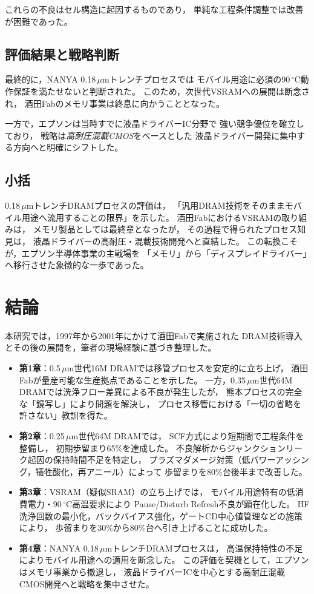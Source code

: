 \documentclass[conference]{IEEEtran}
\begin{document}
これらの不良はセル構造に起因するものであり，
単純な工程条件調整では改善が困難であった。

\subsection{評価結果と戦略判断}
最終的に，NANYA 0.18\,$\mu$mトレンチプロセスでは
モバイル用途に必須の90\,$^\circ$C動作保証を満たせないと判断された。
このため，次世代VSRAMへの展開は断念され，
酒田Fabのメモリ事業は終息に向かうこととなった。

一方で，エプソンは当時すでに液晶ドライバーIC分野で
強い競争優位を確立しており，
戦略は\emph{高耐圧混載CMOS}をベースとした
液晶ドライバー開発に集中する方向へと明確にシフトした。

\subsection{小括}
0.18\,$\mu$mトレンチDRAMプロセスの評価は，
「汎用DRAM技術をそのままモバイル用途へ流用することの限界」を示した。
酒田FabにおけるVSRAMの取り組みは，
メモリ製品としては最終章となったが，
その過程で得られたプロセス知見は，
液晶ドライバーの高耐圧・混載技術開発へと直結した。
この転換こそが，エプソン半導体事業の主戦場を
「メモリ」から「ディスプレイドライバー」へ移行させた象徴的な一歩であった。

\section{結論}

本研究では，1997年から2001年にかけて酒田Fabで実施された
DRAM技術導入とその後の展開を，筆者の現場経験に基づき整理した。

\begin{itemize}
  \item \textbf{第1章}：0.5\,$\mu$m世代16M DRAMでは移管プロセスを安定的に立ち上げ，
        酒田Fabが量産可能な生産拠点であることを示した。
        一方，0.35\,$\mu$m世代64M DRAMでは洗浄フロー差異による不良が発生したが，
        熊本プロセスの完全な「鏡写し」により問題を解決し，
        プロセス移管における「一切の省略を許さない」教訓を得た。
  \item \textbf{第2章}：0.25\,$\mu$m世代64M DRAMでは，
        SCF方式により短期間で工程条件を整備し，
        初期歩留まり65\%を達成した。
        不良解析からジャンクションリーク起因の保持時間不足を特定し，
        プラズマダメージ対策（低パワーアッシング，犠牲酸化，再アニール）によって
        歩留まりを80\%台後半まで改善した。
  \item \textbf{第3章}：VSRAM（疑似SRAM）の立ち上げでは，
        モバイル用途特有の低消費電力・90\,$^\circ$C高温要求により
        Pause/Disturb Refresh不良が顕在化した。
        HF洗浄回数の最小化，バックバイアス強化，ゲートCD中心値管理などの施策により，
        歩留まりを30\%から80\%台へ引き上げることに成功した。
  \item \textbf{第4章}：NANYA 0.18\,$\mu$mトレンチDRAMプロセスは，
        高温保持特性の不足によりモバイル用途への適用を断念した。
        この評価を契機として，エプソンはメモリ事業から撤退し，
        液晶ドライバーICを中心とする高耐圧混載CMOS開発へと戦略を集中させた。
\end{itemize}
\end{document}
